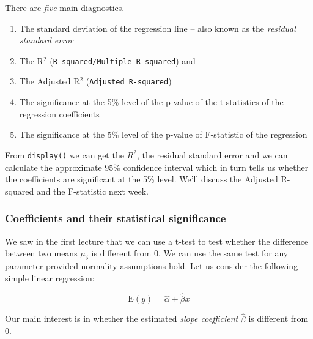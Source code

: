 \documentclass[
]{gitbook}
\providecommand{\tightlist}{%
  \setlength{\itemsep}{0pt}\setlength{\parskip}{0pt}}
\begin{document}
There are \emph{five} main diagnostics.

\begin{enumerate}
\def\labelenumi{\arabic{enumi}.}
\tightlist
\item
  The standard deviation of the regression line -- also known as the \emph{residual standard error}
\item
  The R\(^2\) (\texttt{R-squared/Multiple\ R-squared}) and
\item
  The Adjusted R\(^2\) (\texttt{Adjusted\ R-squared})
\item
  The significance at the 5\% level of the p-value of the t-statistics of the regression coefficients
\item
  The significance at the 5\% level of the p-value of F-statistic of the regression
\end{enumerate}

From \texttt{display()} we can get the \(R^2\), the residual standard error and we can calculate the approximate 95\% confidence interval which in turn tells us whether the coefficients are significant at the 5\% level. We'll discuss the Adjusted R-squared and the F-statistic next week.

\hypertarget{coefficients-and-their-statistical-significance}{%
\subsubsection{Coefficients and their statistical significance}\label{coefficients-and-their-statistical-significance}}

We saw in the first lecture that we can use a t-test to test whether the difference between two means \(\mu_{\delta}\) is different from 0. We can use the same test for any parameter provided normality assumptions hold. Let us consider the following simple linear regression:

\[ \mbox{E}(y) = \hat{\alpha} + \hat{\beta} x \]

Our main interest is in whether the estimated \emph{slope coefficient} \(\hat{\beta}\) is different from 0.

\end{document}
